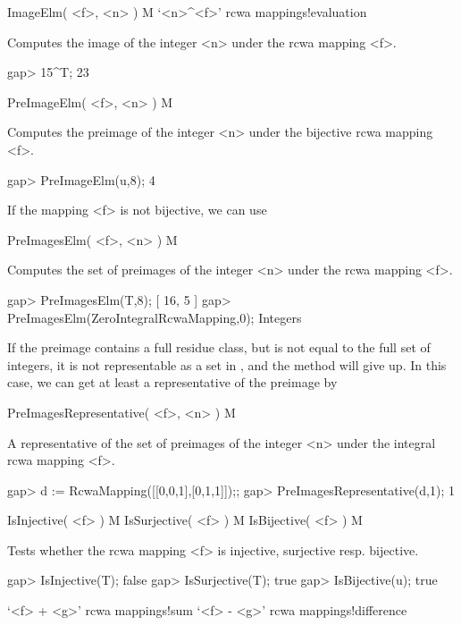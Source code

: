 \endexample


\>ImageElm( <f>, <n> ) M
\>`<n>^<f>' {rcwa mappings!evaluation}

Computes the image of the integer <n> under the rcwa mapping <f>.

\beginexample
gap> 15^T;
23
\endexample

\>PreImageElm( <f>, <n> ) M

Computes the preimage of the integer <n> under the bijective rcwa mapping
<f>.

\beginexample
gap> PreImageElm(u,8);
4
\endexample

If the mapping <f> is not bijective, we can use

\>PreImagesElm( <f>, <n> ) M

Computes the set of preimages of the integer <n> under the rcwa mapping
<f>.

\beginexample
gap> PreImagesElm(T,8);
[ 16, 5 ]
gap> PreImagesElm(ZeroIntegralRcwaMapping,0);
Integers
\endexample

If the preimage contains a full residue class, but is not equal to
the full set of integers, it is not representable as a set in {\GAP}, and
the method will give up.
In this case, we can get at least a representative of the preimage by

\>PreImagesRepresentative( <f>, <n> ) M

A representative of the set of preimages of the integer <n> under the
integral rcwa mapping <f>.

\beginexample
gap> d := RcwaMapping([[0,0,1],[0,1,1]]);;
gap> PreImagesRepresentative(d,1);
1
\endexample


\>IsInjective( <f> ) M
\>IsSurjective( <f> ) M
\>IsBijective( <f> ) M

Tests whether the rcwa mapping <f> is injective, surjective resp.
bijective.

\beginexample
gap> IsInjective(T);
false
gap> IsSurjective(T);
true
gap> IsBijective(u);
true
\endexample


\>`<f> + <g>' {rcwa mappings!sum}
\>`<f> - <g>' {rcwa mappings!difference}

